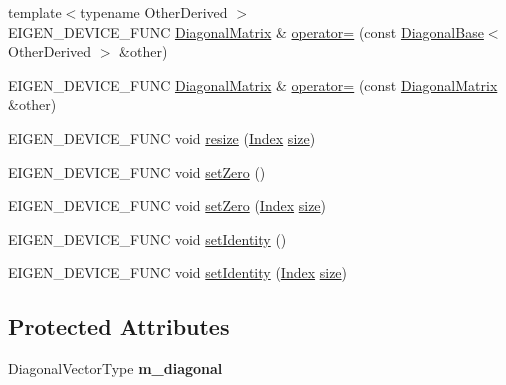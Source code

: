 \begin{DoxyCompactItemize}
\item 
{\footnotesize template$<$typename Other\+Derived $>$ }\\E\+I\+G\+E\+N\+\_\+\+D\+E\+V\+I\+C\+E\+\_\+\+F\+U\+NC \mbox{\hyperlink{class_eigen_1_1_diagonal_matrix}{Diagonal\+Matrix}} \& \mbox{\hyperlink{class_eigen_1_1_diagonal_matrix_a0a189cd40211ce0790fb3fe218af2aed}{operator=}} (const \mbox{\hyperlink{class_eigen_1_1_diagonal_base}{Diagonal\+Base}}$<$ Other\+Derived $>$ \&other)
\item 
E\+I\+G\+E\+N\+\_\+\+D\+E\+V\+I\+C\+E\+\_\+\+F\+U\+NC \mbox{\hyperlink{class_eigen_1_1_diagonal_matrix}{Diagonal\+Matrix}} \& \mbox{\hyperlink{class_eigen_1_1_diagonal_matrix_a28c7f367f27a1fa0791e46e756e1c287}{operator=}} (const \mbox{\hyperlink{class_eigen_1_1_diagonal_matrix}{Diagonal\+Matrix}} \&other)
\item 
E\+I\+G\+E\+N\+\_\+\+D\+E\+V\+I\+C\+E\+\_\+\+F\+U\+NC void \mbox{\hyperlink{class_eigen_1_1_diagonal_matrix_a4ebe032fddd2507357c0bb233637c450}{resize}} (\mbox{\hyperlink{struct_eigen_1_1_eigen_base_a554f30542cc2316add4b1ea0a492ff02}{Index}} \mbox{\hyperlink{struct_eigen_1_1_eigen_base_ac2c9348df3bb9c0044dbae6c278a8977}{size}})
\item 
E\+I\+G\+E\+N\+\_\+\+D\+E\+V\+I\+C\+E\+\_\+\+F\+U\+NC void \mbox{\hyperlink{class_eigen_1_1_diagonal_matrix_a4d9b1c1fd53e4bee2e94098c8378db8e}{set\+Zero}} ()
\item 
E\+I\+G\+E\+N\+\_\+\+D\+E\+V\+I\+C\+E\+\_\+\+F\+U\+NC void \mbox{\hyperlink{class_eigen_1_1_diagonal_matrix_a9f1a1ca602e5432b6856d3a6783a6d1c}{set\+Zero}} (\mbox{\hyperlink{struct_eigen_1_1_eigen_base_a554f30542cc2316add4b1ea0a492ff02}{Index}} \mbox{\hyperlink{struct_eigen_1_1_eigen_base_ac2c9348df3bb9c0044dbae6c278a8977}{size}})
\item 
E\+I\+G\+E\+N\+\_\+\+D\+E\+V\+I\+C\+E\+\_\+\+F\+U\+NC void \mbox{\hyperlink{class_eigen_1_1_diagonal_matrix_a4d52100471c1212cbaba950b0c39f8c9}{set\+Identity}} ()
\item 
E\+I\+G\+E\+N\+\_\+\+D\+E\+V\+I\+C\+E\+\_\+\+F\+U\+NC void \mbox{\hyperlink{class_eigen_1_1_diagonal_matrix_ae0cb9721da2963320857ec4b64eed1ea}{set\+Identity}} (\mbox{\hyperlink{struct_eigen_1_1_eigen_base_a554f30542cc2316add4b1ea0a492ff02}{Index}} \mbox{\hyperlink{struct_eigen_1_1_eigen_base_ac2c9348df3bb9c0044dbae6c278a8977}{size}})
\end{DoxyCompactItemize}
\subsection*{Protected Attributes}
\begin{DoxyCompactItemize}
\item 
\mbox{\label{class_eigen_1_1_diagonal_matrix_aecf48407617023fcdb1c808b7d3720be}} 
Diagonal\+Vector\+Type {\bfseries m\+\_\+diagonal}
\end{DoxyCompactItemize}



